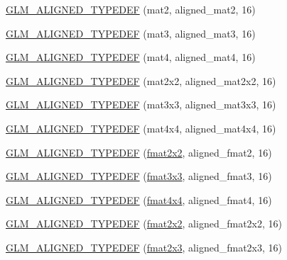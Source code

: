 \begin{DoxyCompactItemize}
\item 
\hyperlink{group__gtx__type__aligned_gafed7d010235a3aa7ea2f88646858f2ae}{G\+L\+M\+\_\+\+A\+L\+I\+G\+N\+E\+D\+\_\+\+T\+Y\+P\+E\+D\+E\+F} (mat2, aligned\+\_\+mat2, 16)
\item 
\hyperlink{group__gtx__type__aligned_ga17f911ee7b78ca6d1b91c4ab51ddb73c}{G\+L\+M\+\_\+\+A\+L\+I\+G\+N\+E\+D\+\_\+\+T\+Y\+P\+E\+D\+E\+F} (mat3, aligned\+\_\+mat3, 16)
\item 
\hyperlink{group__gtx__type__aligned_ga31940e6012b72110e26fdb0f54805033}{G\+L\+M\+\_\+\+A\+L\+I\+G\+N\+E\+D\+\_\+\+T\+Y\+P\+E\+D\+E\+F} (mat4, aligned\+\_\+mat4, 16)
\item 
\hyperlink{group__gtx__type__aligned_ga01de96cd0b541c52d2b4a3faf65822e9}{G\+L\+M\+\_\+\+A\+L\+I\+G\+N\+E\+D\+\_\+\+T\+Y\+P\+E\+D\+E\+F} (mat2x2, aligned\+\_\+mat2x2, 16)
\item 
\hyperlink{group__gtx__type__aligned_gac88a191b004bd341e64fc53b5a4d00e3}{G\+L\+M\+\_\+\+A\+L\+I\+G\+N\+E\+D\+\_\+\+T\+Y\+P\+E\+D\+E\+F} (mat3x3, aligned\+\_\+mat3x3, 16)
\item 
\hyperlink{group__gtx__type__aligned_gabe8c745fa2ced44a600a6e3f19991161}{G\+L\+M\+\_\+\+A\+L\+I\+G\+N\+E\+D\+\_\+\+T\+Y\+P\+E\+D\+E\+F} (mat4x4, aligned\+\_\+mat4x4, 16)
\item 
\hyperlink{group__gtx__type__aligned_ga719da577361541a4c43a2dd1d0e361e1}{G\+L\+M\+\_\+\+A\+L\+I\+G\+N\+E\+D\+\_\+\+T\+Y\+P\+E\+D\+E\+F} (\hyperlink{group__gtc__type__precision_ga20fdbcc6b16bed27ad25db9b71d09e93}{fmat2x2}, aligned\+\_\+fmat2, 16)
\item 
\hyperlink{group__gtx__type__aligned_ga6e7ee4f541e1d7db66cd1a224caacafb}{G\+L\+M\+\_\+\+A\+L\+I\+G\+N\+E\+D\+\_\+\+T\+Y\+P\+E\+D\+E\+F} (\hyperlink{group__gtc__type__precision_ga577209f19554f5291cc3d66dda9a4388}{fmat3x3}, aligned\+\_\+fmat3, 16)
\item 
\hyperlink{group__gtx__type__aligned_gae5d672d359f2a39f63f98c7975057486}{G\+L\+M\+\_\+\+A\+L\+I\+G\+N\+E\+D\+\_\+\+T\+Y\+P\+E\+D\+E\+F} (\hyperlink{group__gtc__type__precision_ga16b508b75c7213ba6b24055ff3b7503d}{fmat4x4}, aligned\+\_\+fmat4, 16)
\item 
\hyperlink{group__gtx__type__aligned_ga6fa2df037dbfc5fe8c8e0b4db8a34953}{G\+L\+M\+\_\+\+A\+L\+I\+G\+N\+E\+D\+\_\+\+T\+Y\+P\+E\+D\+E\+F} (\hyperlink{group__gtc__type__precision_ga20fdbcc6b16bed27ad25db9b71d09e93}{fmat2x2}, aligned\+\_\+fmat2x2, 16)
\item 
\hyperlink{group__gtx__type__aligned_ga0743b4f4f69a3227b82ff58f6abbad62}{G\+L\+M\+\_\+\+A\+L\+I\+G\+N\+E\+D\+\_\+\+T\+Y\+P\+E\+D\+E\+F} (\hyperlink{group__gtc__type__precision_ga80f463bcb7e5008c11af5fdbc52c0045}{fmat2x3}, aligned\+\_\+fmat2x3, 16)

\end{DoxyCompactItemize}
